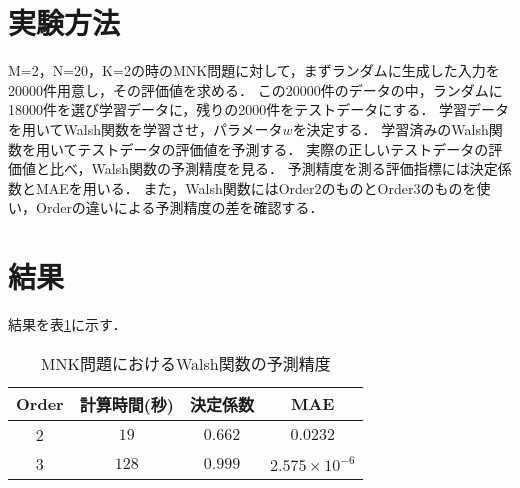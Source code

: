 \documentclass[main]{subfiles}
\begin{document}
        \section{実験方法}
        M=2，N=20，K=2の時のMNK問題に対して，まずランダムに生成した入力を20000件用意し，その評価値を求める．
        この20000件のデータの中，ランダムに18000件を選び学習データに，残りの2000件をテストデータにする．
        学習データを用いてWalsh関数を学習させ，パラメータ$w$を決定する．
        学習済みのWalsh関数を用いてテストデータの評価値を予測する．
        実際の正しいテストデータの評価値と比べ，Walsh関数の予測精度を見る．
        予測精度を測る評価指標には決定係数とMAEを用いる．
        また，Walsh関数にはOrder2のものとOrder3のものを使い，Orderの違いによる予測精度の差を確認する．

        \section{結果}
        結果を表\ref{mnk_result}に示す．
        \begin{table}[h]
            \centering
            \caption{MNK問題におけるWalsh関数の予測精度}
            \begin{tabular}{c|ccc}
              Order & 計算時間(秒) & 決定係数 & MAE\\ \hline
              2 & $19$ & $0.662$ & $0.0232$ \\
              3 & $128$ & $0.999$ & $2.575 \times 10^{-6}$ \\
            \end{tabular}
            \label{mnk_result}
        \end{table}
\end{document}
